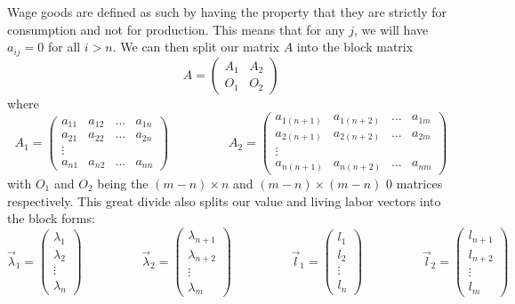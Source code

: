 \documentclass{article}
\theoremstyle{definition}
\theoremstyle{plain}
\theoremstyle{theorem}
\begin{document}
 Wage goods are defined as such by having the property that they are strictly for consumption and not for production. This means that for any $j$, we will have $a_{ij} = 0$ for all $i>n$. We can then split our matrix $A$ into the block matrix
\[ A = \begin{pmatrix} A_1 & A_2 \\ O_1 & O_2 \end{pmatrix} \]
where
\[ A_1 = \begin{pmatrix} a_{11} & a_{12} & \ldots & a_{1n} \\
			a_{21} & a_{22} & \ldots & a_{2n} \\
			\vdots \\ a_{n1} & a_{n2} & \ldots & a_{nn} \end{pmatrix} \hspace{2cm} A_2 = \begin{pmatrix} a_{1(n+1)} & a_{1(n+2)} & \ldots & a_{1m} \\
			a_{2(n+1)} & a_{2(n+2)} & \ldots & a_{2m} \\
			\vdots \\ a_{n(n+1)} & a_{n(n+2)} & \ldots & a_{nm} \end{pmatrix} \]
with $O_1$ and $O_2$ being the $(m-n)\times n$ and $(m-n) \times (m-n)$ $0$ matrices respectively. This great divide also splits our value and living labor vectors into the block forms:
 \[ \vec{\lambda}_1 = \begin{pmatrix} \lambda_1 \\ \lambda_2 \\ \vdots \\ \lambda_n \end{pmatrix} \hspace{2cm} \vec{\lambda}_2  = \begin{pmatrix} \lambda_{n+1} \\ \lambda_{n+2} \\ \vdots \\ \lambda_m \end{pmatrix} \hspace{2cm} \vec{l}_1  = \begin{pmatrix} l_1 \\ l_2 \\ \vdots \\ l_n \end{pmatrix} \hspace{2cm} \vec{l}_2  = \begin{pmatrix} l_{n+1} \\ l_{n+2} \\ \vdots \\ l_m \end{pmatrix} \]
\end{document}
